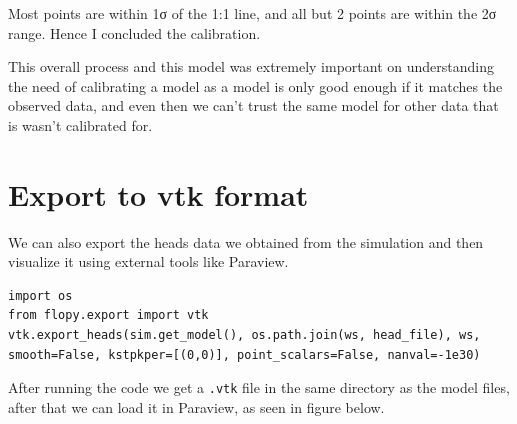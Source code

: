 \documentclass[titlepage,12pt]{unisubmission}
\begin{document}
Most points are within 1σ of the 1:1 line, and all but 2 points are within the 2σ range. Hence I concluded the calibration.

This overall process and this model was extremely important on understanding the need of calibrating a model as a model is only good enough if it matches the observed data, and even then we can't trust the same model for other data that is wasn't calibrated for.


\section{Export to vtk format}
\label{sec:orgce27509}

We can also export the heads data we obtained from the simulation and then visualize it using external tools like Paraview.

\begin{verbatim}
import os
from flopy.export import vtk
vtk.export_heads(sim.get_model(), os.path.join(ws, head_file), ws, smooth=False, kstpkper=[(0,0)], point_scalars=False, nanval=-1e30)
\end{verbatim}

After running the code we get a \texttt{.vtk} file in the same directory as the model files, after that we can load it in Paraview, as seen in figure below.
\end{document}

